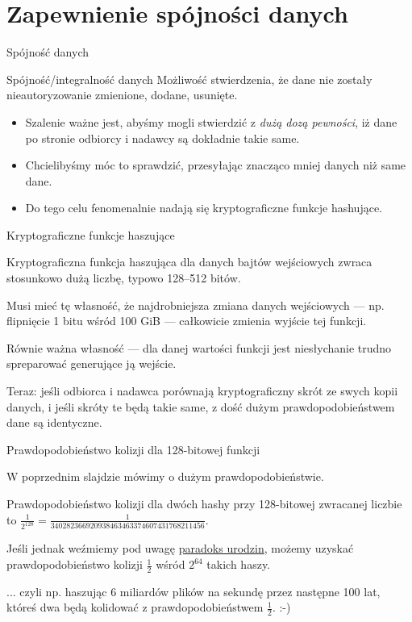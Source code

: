 \section{Zapewnienie spójności danych}

\begin{frame}{Spójność danych}
	
	\begin{alertblock}{Spójność/integralność danych}
		Możliwość stwierdzenia, że dane nie zostały nieautoryzowanie zmienione, dodane, usunięte.
	\end{alertblock}

	\begin{itemize}
		\item Szalenie ważne jest, abyśmy mogli stwierdzić z \emph{dużą dozą pewności}, iż dane po stronie odbiorcy i nadawcy są dokładnie takie same.
		
		\item Chcielibyśmy móc to sprawdzić, przesyłając znacząco mniej danych niż same dane.
		
		\item Do tego celu fenomenalnie nadają się kryptograficzne funkcje hashujące.
		
	\end{itemize}	

\end{frame}

\begin{frame}{Kryptograficzne funkcje haszujące}
	
	Kryptograficzna funkcja haszująca dla danych bajtów wejściowych zwraca stosunkowo dużą liczbę, typowo 128--512 bitów.
	
	Musi mieć tę własność, że najdrobniejsza zmiana danych wejściowych --- np. flipnięcie 1 bitu wśród 100 GiB --- całkowicie zmienia wyjście tej funkcji.
	
	Równie ważna własność --- dla danej wartości funkcji jest niesłychanie trudno spreparować generujące ją wejście.
	
	Teraz: jeśli odbiorca i nadawca porównają kryptograficzny skrót ze swych kopii danych, i jeśli skróty te będą takie same, z dość dużym prawdopodobieństwem dane są identyczne.
	
\end{frame}

\begin{frame}{Prawdopodobieństwo kolizji dla 128-bitowej funkcji}
	
	W poprzednim slajdzie mówimy o dużym prawdopodobieństwie.
	
	Prawdopodobieństwo kolizji dla dwóch hashy przy 128-bitowej zwracanej liczbie to $\frac{1}{2^{128}}=\frac{1}{340282366920938463463374607431768211456}$.
	
	Jeśli jednak weźmiemy pod uwagę \href{http://en.wikipedia.org/wiki/Birthday_problem}{paradoks urodzin}, możemy uzyskać prawdopodobieństwo kolizji $\frac{1}{2}$ wśród $2^{64}$ takich haszy.
	
	... czyli np. haszując 6 miliardów plików na sekundę przez następne 100 lat, któreś dwa będą kolidować z prawdopodobieństwem $\frac{1}{2}$. :-)
	
\end{frame}

